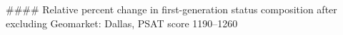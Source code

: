 #### Relative percent change in first-generation status composition after excluding Geomarket: Dallas, PSAT score 1190–1260
